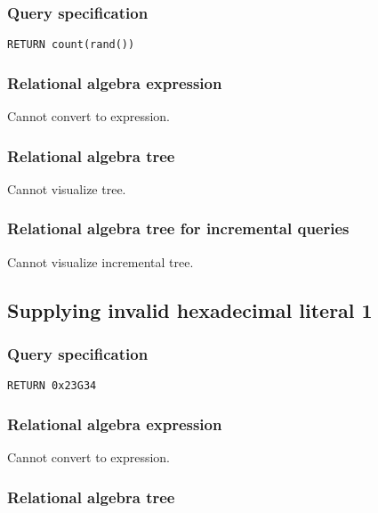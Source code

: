\subsubsection*{Query specification}

\begin{lstlisting}
RETURN count(rand())
\end{lstlisting}

\subsubsection*{Relational algebra expression}

Cannot convert to expression.

\subsubsection*{Relational algebra tree}

Cannot visualize tree.

\subsubsection*{Relational algebra tree for incremental queries}

Cannot visualize incremental tree.

\subsection{Supplying invalid hexadecimal literal 1}

\subsubsection*{Query specification}

\begin{lstlisting}
RETURN 0x23G34
\end{lstlisting}

\subsubsection*{Relational algebra expression}

Cannot convert to expression.

\subsubsection*{Relational algebra tree}

